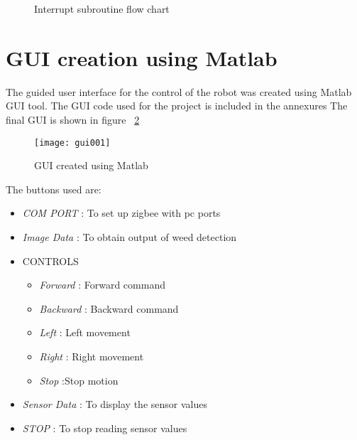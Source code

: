 \documentclass{report}
\begin{document}
\begin{figure}
\begin{center}
\end{center}
\caption{Interrupt subroutine flow chart}
\label{flw5b}
\end{figure}
\section{GUI creation using Matlab}
The guided user interface for the control of the robot was created using Matlab GUI tool.
The GUI code used for the project is included in the annexures
The final GUI is shown in figure ~\ref{fig38}
\begin{figure}[h!]
\centering
\texttt{[image: gui001]}
\caption{GUI created using Matlab}
\label{fig38}
\end{figure}
\FloatBarrier

The buttons used are:
\begin{itemize}
\item \emph{COM PORT} : To set up zigbee with pc ports
\item \emph{Image Data} : To obtain output of weed detection
\item CONTROLS
\begin{itemize}
\item \emph{Forward} : Forward command
\item \emph{Backward} : Backward command
\item \emph{Left}	: Left movement
\item \emph{Right}	: Right movement
\item \emph{Stop}	:Stop motion
\end{itemize}
\item \emph{Sensor Data} : To display the sensor values
\item \emph{STOP} : To stop reading sensor values
\end{itemize}
\end{document}
